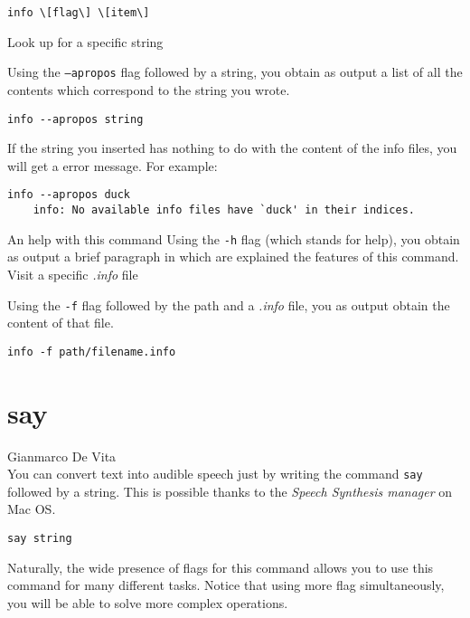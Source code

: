 \documentclass[hidelinks,12pt,a4paper,numbers=enddot]{scrartcl}
\begin{document}
\begin{verbatim}
info \[flag\] \[item\]
\end{verbatim}

Look up for a specific string

Using the \texttt{--apropos} flag followed by a string, you obtain as
output a list of all the contents which correspond to the string you wrote.

\begin{verbatim}
info --apropos string
\end{verbatim}

If the string you inserted has nothing to do with the content of the info files,
you will get a error message. For example:

\begin{verbatim}
info --apropos duck
    info: No available info files have `duck' in their indices.
\end{verbatim}

An help with this command
Using the \texttt{-h} flag (which stands for help), you obtain as
output a brief paragraph in which are explained the features of this command.\\

Visit a specific \emph{.info} file

Using the \texttt{-f} flag followed by the path and a \emph{.info} file, you
as output obtain the content of that file.

\begin{verbatim}
info -f path/filename.info
\end{verbatim}

\section{say}


\large Gianmarco De Vita \normalsize\\



You can convert text into audible speech just by writing the command
\texttt{say} followed by a string.
This is possible thanks to the \emph{Speech Synthesis manager} on Mac OS.

\begin{verbatim}
say string
\end{verbatim}

Naturally, the wide presence of flags for this command allows you to use
this command for many different tasks. Notice that using more flag
simultaneously, you will be able to solve more complex operations.\\
\end{document}
